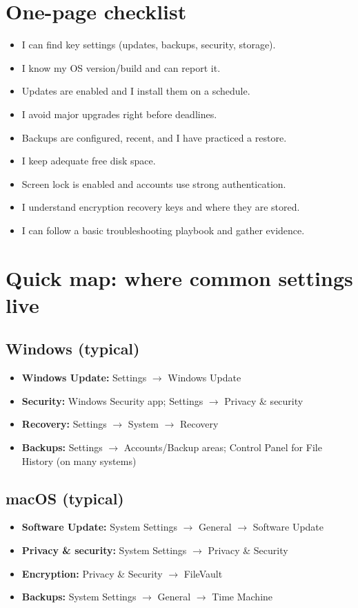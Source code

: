 \section{One-page checklist}
\begin{itemize}
\item I can find key settings (updates, backups, security, storage).
\item I know my OS version/build and can report it.
\item Updates are enabled and I install them on a schedule.
\item I avoid major upgrades right before deadlines.
\item Backups are configured, recent, and I have practiced a restore.
\item I keep adequate free disk space.
\item Screen lock is enabled and accounts use strong authentication.
\item I understand encryption recovery keys and where they are stored.
\item I can follow a basic troubleshooting playbook and gather evidence.
\end{itemize}

\section{Quick map: where common settings live}
\subsection{Windows (typical)}
\begin{itemize}
\item \textbf{Windows Update:} Settings $\rightarrow$ Windows Update
\item \textbf{Security:} Windows Security app; Settings $\rightarrow$ Privacy \& security
\item \textbf{Recovery:} Settings $\rightarrow$ System $\rightarrow$ Recovery
\item \textbf{Backups:} Settings $\rightarrow$ Accounts/Backup areas; Control Panel for File History (on many systems)
\end{itemize}

\subsection{macOS (typical)}
\begin{itemize}
\item \textbf{Software Update:} System Settings $\rightarrow$ General $\rightarrow$ Software Update
\item \textbf{Privacy \& security:} System Settings $\rightarrow$ Privacy \& Security
\item \textbf{Encryption:} Privacy \& Security $\rightarrow$ FileVault
\item \textbf{Backups:} System Settings $\rightarrow$ General $\rightarrow$ Time Machine
\end{itemize}


